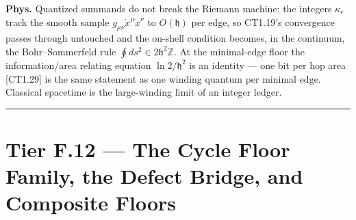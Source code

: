 \begin{theorem}
\textbf{Phys.} Quantized summands do not break the Riemann machine: the integers $\kappa_e$ track the smooth sample $g_{\mu\nu}\dot x^\mu\dot x^\nu$ to $O(\mathfrak h)$ per edge, so CT1.19's convergence passes through untouched and the on-shell condition becomes, in the continuum, the Bohr–Sommerfeld rule $\oint ds^2\in2\mathfrak h^2\mathbb Z$. At the minimal-edge floor the information/area relating equation $\ln2/\mathfrak h^2$ is an identity — one bit per hop area [CT1.29] is the same statement as one winding quantum per minimal edge. Classical spacetime is the large-winding limit of an integer ledger.

\vspace{2pt}\noindent\rule{\textwidth}{0.4pt}\vspace{2pt}

\end{theorem}

\section[Tier F.12 — The Cycle Floor Family, the Defect Bridge, and…]{\texorpdfstring{Tier F.12 — The Cycle Floor Family, the Defect Bridge, and Composite Floors}{Tier F.12 - The Cycle Floor Family, the Defect Bridge, and Composite Floors}}

